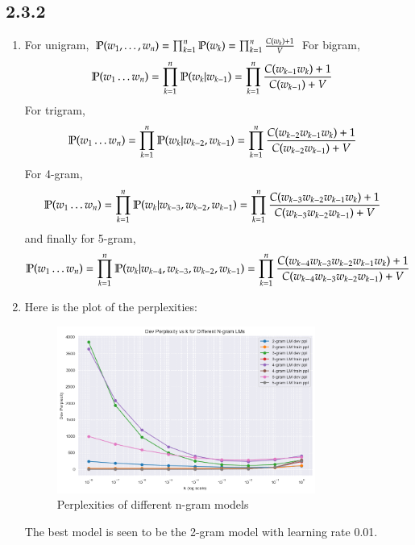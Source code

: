 \documentclass[12pt]{article}
\theoremstyle{definitionstyle}
\renewcommand{\P}{\mathbb P\qty}
\begin{document}
    \subsection*{2.3.2}
    \begin{enumerate}
        \item For unigram, $\P(w_1, \ldots, w_n) = \prod_{k=1}^n \P(w_k) = \prod_{k=1}^n \frac{C(w_k)+1}{V}$
        For bigram,
        \begin{align*}
            \P(w_1 \ldots w_n) &= \prod_{k=1}^n \P(w_k | w_{k-1}) = \prod_{k=1}^n \frac{C(w_{k-1}w_k)+1}{C(w_{k-1})+V}
        \end{align*}
        For trigram,
        \begin{align*}
            \P(w_1 \ldots w_n) &= \prod_{k=1}^n \P(w_k | w_{k-2}, w_{k-1}) = \prod_{k=1}^n \frac{C(w_{k-2}w_{k-1}w_k)+1}{C(w_{k-2}w_{k-1})+V}
        \end{align*}
        For 4-gram,
        \begin{align*}
            \P(w_1 \ldots w_n) &= \prod_{k=1}^n \P(w_k | w_{k-3}, w_{k-2}, w_{k-1}) = \prod_{k=1}^n \frac{C(w_{k-3}w_{k-2}w_{k-1}w_k)+1}{C(w_{k-3}w_{k-2}w_{k-1})+V}
        \end{align*}
        and finally for 5-gram,
        \begin{align*}
            \P(w_1 \ldots w_n) &= \prod_{k=1}^n \P(w_k | w_{k-4}, w_{k-3}, w_{k-2}, w_{k-1}) = \prod_{k=1}^n \frac{C(w_{k-4}w_{k-3}w_{k-2}w_{k-1}w_k)+1}{C(w_{k-4}w_{k-3}w_{k-2}w_{k-1})+V}
        \end{align*}

        \item Here is the plot of the perplexities:
        \begin{figure}[H]
            \centering
            \includegraphics[width=0.8\textwidth]{ppls.png}
            \caption{Perplexities of different n-gram models}
            \label{fig:perplexities}
        \end{figure}
        The best model is seen to be the 2-gram model with learning rate 0.01.



\end{enumerate}
\end{document}
